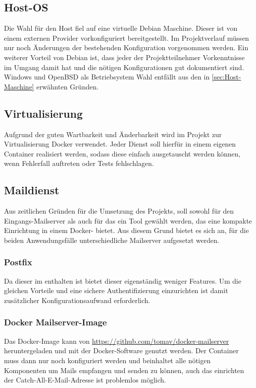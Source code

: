 \documentclass[a4paper,11pt,singlespacing]{article}
\begin{document}
	\subsection{Host-OS}\label{sec:AuswahlLösungHost-Maschine}
		Die Wahl für den Host fiel auf eine virtuelle Debian Maschine.
		Dieser ist von einem externen Provider vorkonfiguriert  bereitgestellt. Im Projektverlauf müssen nur noch Änderungen der bestehenden Konfiguration vorgenommen werden.
		Ein weiterer Vorteil von Debian ist, dass jeder der Projektteilnehmer Vorkenntnisse im Umgang damit hat und die nötigen Konfigurationen gut dokumentiert sind.
		Windows und OpenBSD als Betriebsystem Wahl entfällt aus den in \autoref{sec:Host-Maschine} erwähnten Gründen.

	\subsection{Virtualisierung}\label{sec:AuswahlLösungVirtualisierung}
		Aufgrund der guten Wartbarkeit und Änderbarkeit wird im Projekt zur Virtualisierung Docker verwendet.
		Jeder Dienst soll hierfür in einem eigenen Container realisiert werden, sodass diese einfach ausgetauscht werden können, wenn Fehlerfall auftreten oder Tests fehlschlagen.

	\subsection{Maildienst}\label{sec:AuswahlLösungMailserver}
		Aus zeitlichen Gründen für die Umsetzung des Projekts, soll sowohl für den Eingangs-Mailserver als auch für das  ein Tool gewählt werden, das eine kompakte Einrichtung in einem Docker- bietet.
		Aus diesem Grund bietet es sich an, für die beiden Anwendungsfälle unterschiedliche Mailserver aufgesetzt werden.
		
		\subsubsection{Postfix}\label{sec:AuswahlLösungPostfix}	
			Da dieser im  enthalten ist bietet dieser eigenständig weniger Features. Um die gleichen Vorteile und eine sichere Authentifizierung einzurichten ist damit zusätzlicher Konfigurationsaufwand erforderlich.
			
		\subsubsection{Docker Mailserver-Image}\label{sec:AuswahlLösungVorkonfigurierterDockerMailserver}
			Das Docker-Image kann von \url{https://github.com/tomav/docker-mailserver} heruntergeladen und mit der Docker-Software genutzt werden. Der Container muss dann nur noch konfiguriert werden und beinhaltet alle nötigen Komponenten um Mails empfangen und senden zu können, auch das einrichten der Catch-All-E-Mail-Adresse ist problemlos möglich.
			
\end{document}
